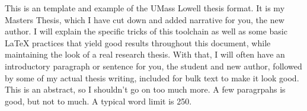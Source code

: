 % 
% 
%

This is an template and example of the UMass Lowell thesis format. It is my Masters Thesis, which I have cut down and added narrative for you, the new author. I will explain the specific tricks of this toolchain as well as some basic LaTeX practices that yield good results throughout this document, while maintaining the look of a real research thesis. With that, I will often have an introductory paragraph or sentence for you, the student and new author, followed by some of my actual thesis writing, included for bulk text to make it look good. This is an abstract, so I shouldn't go on too much more. A few paragrpahs is good, but not to much. A typical word limit is 250.
